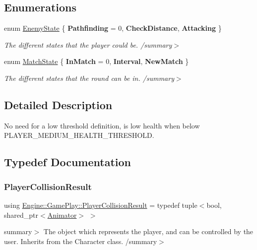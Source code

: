 \subsection*{Enumerations}
\begin{DoxyCompactItemize}
\item 
\mbox{\label{namespace_engine_1_1_game_play_a835aedaa2c294a7f7b63da8964c77461}} 
enum \hyperlink{namespace_engine_1_1_game_play_a835aedaa2c294a7f7b63da8964c77461}{Enemy\+State} \{ {\bfseries Pathfinding} = 0, 
{\bfseries Check\+Distance}, 
{\bfseries Attacking}
 \}\begin{DoxyCompactList}\small\item\em The different states that the player could be. /summary$>$ \end{DoxyCompactList}
\item 
\mbox{\label{namespace_engine_1_1_game_play_a06a8ba6c73c14715e83f2b2ee2351175}} 
enum \hyperlink{namespace_engine_1_1_game_play_a06a8ba6c73c14715e83f2b2ee2351175}{Match\+State} \{ {\bfseries In\+Match} = 0, 
{\bfseries Interval}, 
{\bfseries New\+Match}
 \}\begin{DoxyCompactList}\small\item\em The different states that the round can be in. /summary$>$ \end{DoxyCompactList}
\end{DoxyCompactItemize}


\subsection{Detailed Description}
No need for a low threshold definition, is low health when below P\+L\+A\+Y\+E\+R\+\_\+\+M\+E\+D\+I\+U\+M\+\_\+\+H\+E\+A\+L\+T\+H\+\_\+\+T\+H\+R\+E\+S\+H\+O\+LD. 

\subsection{Typedef Documentation}
\mbox{\label{namespace_engine_1_1_game_play_a89de39a63577930bef8a01ad64b643c6}} 
\subsubsection{\texorpdfstring{Player\+Collision\+Result}{PlayerCollisionResult}}
{\footnotesize\ttfamily using \hyperlink{namespace_engine_1_1_game_play_a89de39a63577930bef8a01ad64b643c6}{Engine\+::\+Game\+Play\+::\+Player\+Collision\+Result} = typedef tuple$<$bool, shared\+\_\+ptr$<$\hyperlink{class_engine_1_1_core_1_1_animator}{Animator}$>$ $>$}

summary$>$ The object which represents the player, and can be controlled by the user. Inherits from the Character class. /summary$>$ 